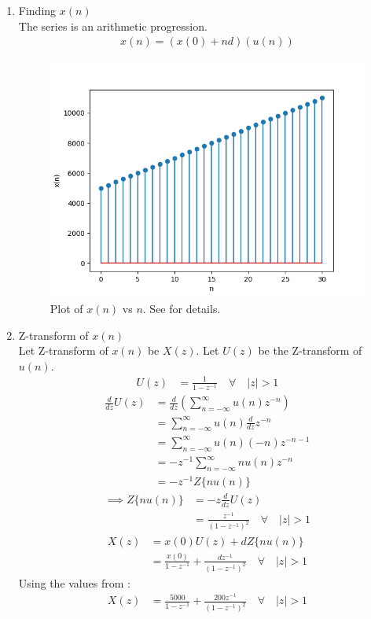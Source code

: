 \documentclass[journal,12pt,twocolumn]{IEEEtran}
\theoremstyle{remark}
\begin{document}
\begin{enumerate}
\item Finding $x(n)$ \\
The series is an arithmetic progression.
\begin{align}
x(n) = (x(0) + nd)(u(n))
\end{align}
\begin{figure}[h!]
    \centering
    \includegraphics[width=\columnwidth]{figs/10_5_2_19.png}
    \caption{Plot of $x(n)$ vs $n$. See  for details.}
    \label{fig:1}
\end{figure}
\item Z-transform of $x(n)$ \\
Let Z-transform of $x(n)$ be $X(z)$. Let $U(z)$ be the Z-transform of $u(n)$.
\begin{align}
U(z) &= \frac{1}{1 - z^{-1}} \quad \forall \quad |z| > 1
\end{align}
\begin{align}
\frac{d}{dz}U(z) &= \frac{d}{dz}(\sum_{n =  -\infty}^{\infty} u(n)z^{-n}) \\
&= \sum_{n = -\infty}^{\infty} u(n)\frac{d}{dz}z^{-n} \\
&= \sum_{n = -\infty}^{\infty} u(n)(-n)z^{-n - 1} \\
&= -z^{-1}\sum_{n = -\infty}^{\infty} nu(n)z^{-n} \\
&= -z^{-1} Z\{nu(n)\}
\end{align}
\begin{align}
\implies Z\{nu(n)\} &= -z\frac{d}{dz}U(z) \\
&= \frac{z^{-1}}{(1 - z^{-1})^2} \quad \forall \quad |z| > 1
\end{align}
\begin{align}
X(z) &= x(0)U(z) + dZ\{nu(n)\} \\
&= \frac{x(0)}{1 - z^{-1}} + \frac{dz^{-1}}{(1 - z^{-1})^2} \quad \forall \quad |z| > 1
\end{align}
Using the values from :
\begin{align}
X(z) &= \frac{5000}{1 - z^{-1}} + \frac{200z^{-1}}{(1 - z^{-1})^2} \quad \forall \quad |z| > 1
\end{align}
\end{enumerate}
\end{document}
